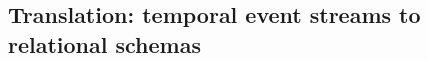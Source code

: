                 

\subsection{Translation: temporal event streams to relational schemas} \label{sec:tgb_translation}

